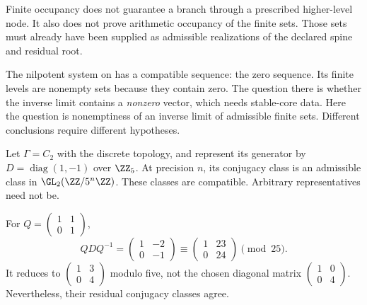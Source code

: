 Finite occupancy does not guarantee a branch through a prescribed higher-level node. It also does not prove arithmetic occupancy of the finite sets. Those sets must already have been supplied as admissible realizations of the declared spine and residual root.

The nilpotent system on  has a compatible sequence: the zero sequence. Its finite levels are nonempty sets because they contain zero. The question there is whether the inverse limit contains a \emph{nonzero} vector, which needs stable-core data. Here the question is nonemptiness of an inverse limit of admissible finite sets. Different conclusions require different hypotheses.


Let $\Gamma=C_2$ with the discrete topology, and represent its generator by $D=\operatorname{diag}(1,-1)$ over $\ZZ_5$. At precision $n$, its conjugacy class is an admissible class in $\GL_2(\ZZ/5^n\ZZ)$. These classes are compatible. Arbitrary representatives need not be.


For $Q=\left(\begin{smallmatrix}1&1\\0&1\end{smallmatrix}\right)$,
\[
QDQ^{-1}=\begin{pmatrix}1&-2\\0&-1\end{pmatrix}
\equiv\begin{pmatrix}1&23\\0&24\end{pmatrix}\pmod{25}.
\]
It reduces to $\left(\begin{smallmatrix}1&3\\0&4\end{smallmatrix}\right)$ modulo five, not the chosen diagonal matrix $\left(\begin{smallmatrix}1&0\\0&4\end{smallmatrix}\right)$. Nevertheless, their residual conjugacy classes agree.


